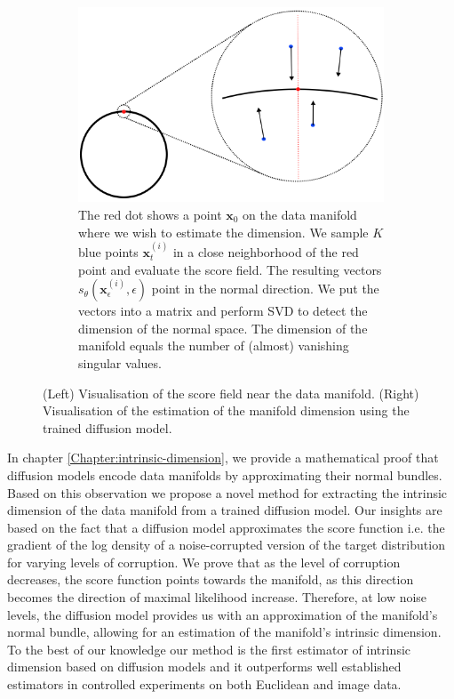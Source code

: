\begin{figure}[h]
\begin{subfigure}[t]{0.45\linewidth}
        \includegraphics[width=\linewidth]{Outline/figures/id-diff/drawing.png}
        \caption{The red dot shows a point $\textbf{x}_0$ on the data manifold where we wish to estimate the dimension. We sample $K$ blue points $\textbf{x}_t^{(i)}$ in a close neighborhood of the red point and evaluate the score field. The resulting vectors $s_\theta(\textbf{x}_\epsilon^{(i)}, \epsilon)$ point in the normal direction. We put the vectors into a matrix and perform SVD to detect the dimension of the normal space. The dimension of the manifold equals the number of (almost) vanishing singular values.}
        \label{fig:zoom}
    \end{subfigure}
    \caption{(Left) Visualisation of the score field near the data manifold. (Right) Visualisation of the estimation of the manifold dimension using the trained diffusion model.}
    \label{fig:score_estimation}
\end{figure}



In chapter \ref{Chapter:intrinsic-dimension}, we provide a mathematical proof
that diffusion models encode data manifolds by
approximating their normal bundles. Based on
this observation we propose a novel method for
extracting the intrinsic dimension of the data manifold from a trained diffusion model. Our insights
are based on the fact that a diffusion model approximates the score function i.e. the gradient
of the log density of a noise-corrupted version of
the target distribution for varying levels of corruption. We prove that as the level of corruption
decreases, the score function points towards the
manifold, as this direction becomes the direction
of maximal likelihood increase. Therefore, at
low noise levels, the diffusion model provides us
with an approximation of the manifold’s normal
bundle, allowing for an estimation of the manifold’s intrinsic dimension. To the best of our
knowledge our method is the first estimator of
intrinsic dimension based on diffusion models
and it outperforms well established estimators in
controlled experiments on both Euclidean and
image data.

